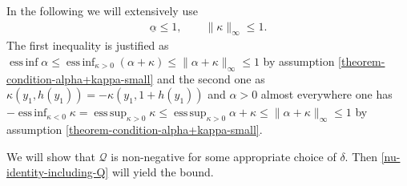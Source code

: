 \documentclass{article}
\theoremstyle{definition}
\theoremstyle{definition}
\DeclareMathOperator*{\essinf}{ess\,inf}
\DeclareMathOperator*{\esssup}{ess\,sup}
\begin{document}

In the following we will extensively use
\begin{align}
    \label{proof-main-theorem-essinf-alpha-and-kappa-leq-1}
    \underline{\alpha}\leq 1, \qquad \|\kappa\|_\infty\leq 1.
\end{align}
The first inequality is justified as $\essinf \alpha \leq \essinf_{\kappa>0} (\alpha+\kappa) \leq \|\alpha+\kappa\|_\infty \leq 1$ by assumption \eqref{theorem-condition-alpha+kappa-small} and the second one as $\kappa(y_1,h(y_1))=-\kappa(y_1,1+h(y_1))$ and $\alpha>0$ almost everywhere one has $-\essinf_{\kappa <0}\kappa=\esssup_{\kappa>0}\kappa\leq \esssup_{\kappa>0} \alpha+\kappa\leq \|\alpha+\kappa\|_\infty\leq 1$ by assumption \eqref{theorem-condition-alpha+kappa-small}.


We will show that $\mathcal{Q}$ is non-negative for some appropriate choice of $\delta$. Then \eqref{nu-identity-including-Q} will yield the bound.
\end{document}
